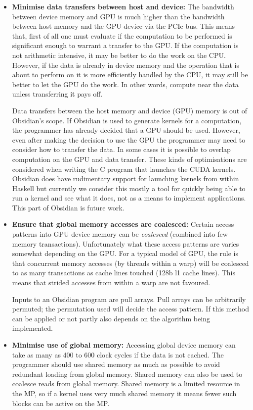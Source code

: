 \documentclass[a4paper]{book}
\begin{document}
\begin{itemize} 

\item {\bf Minimise data transfers between host and device:} The bandwidth between device memory 
and GPU is much higher than the bandwidth between host memory and the GPU device via the PCIe bus.
This means that, first of all one must evaluate if the computation to be performed is significant 
enough to warrant a transfer to the GPU. If the computation is not arithmetic intensive, it may be 
better to do the work on the CPU. However, if the data is already in device memory and 
the operation that is about to perform on it is more efficiently handled by the CPU, it may still 
be better to let the GPU do the work. In other words, compute near the data unless transferring it 
pays off. 

Data transfers between the host memory and device (GPU) memory is out of Obsidian's scope. 
If Obsidian is used to generate kernels for a computation, the programmer has already decided that 
a GPU should be used. However, even after making the decision to use the GPU the programmer 
may need to consider how to transfer the data. In some cases it is possible to overlap 
computation on the GPU and data transfer. These kinds of optimisations are considered 
when writing the C program that launches the CUDA kernels. Obsidian does have rudimentary 
support for launching kernels from within Haskell but currently we consider this mostly a
tool for quickly being able to run a kernel and see what it does, not as a means to implement 
applications. This part of Obsidian is future work. 

\item {\bf Ensure that global memory accesses are coalesced:} Certain access patterns into 
GPU device memory can be {\em coalesced} (combined into few memory transactions). Unfortunately 
what these access patterns are varies somewhat depending on the GPU. For a typical model of 
GPU, the rule is that concurrent memory accesses (by threads within a warp) will be coalesced 
to as many transactions as cache lines touched (128b l1 cache lines). This means that strided 
accesses from within a warp are not favoured. 

Inputs to an Obsidian program are pull arrays. Pull arrays can be arbitrarily permuted; 
the permutation used will decide the access pattern. If this method can be applied or 
not partly also depends on the algorithm being implemented. 

\item {\bf Minimise use of global memory:} Accessing global device memory can take as 
many as 400 to 600 clock cycles if the data is not cached. The programmer should 
use shared memory as much as possible to avoid redundant loading from global memory.
Shared memory can also be used to coalesce reads from global memory. Shared memory is 
a limited resource in the MP, so if a kernel uses very much shared memory it means 
fewer such blocks can be active on the MP. 


\end{itemize}
\end{document}
